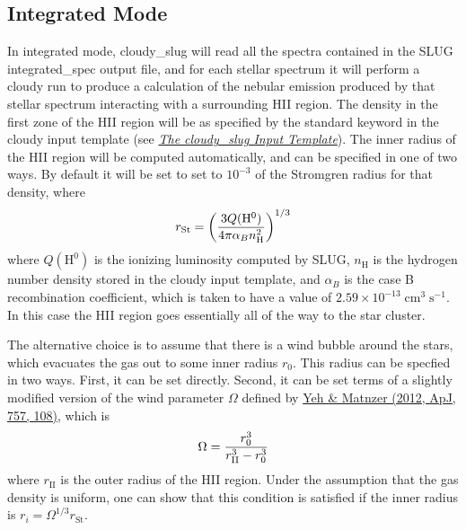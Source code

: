 \documentclass[letterpaper,10pt,english]{sphinxmanual}
\begin{document}
\subsection{Integrated Mode}
\label{cloudy:sssec-cloudy-integrated-mode}\label{cloudy:integrated-mode}
In integrated mode, cloudy\_slug will read all the spectra contained in
the SLUG integrated\_spec output file, and for each stellar spectrum it
will perform a cloudy run to produce a calculation of the nebular
emission produced by that stellar spectrum interacting with a
surrounding HII region. The density in the first zone of the HII
region will be as specified by the standard  keyword in the
cloudy input template (see {\hyperref[cloudy:ssec\string-cloudy\string-template]{\emph{The cloudy\_slug Input Template}}}). The inner
radius of the HII region will be computed automatically, and can be
specified in one of two ways. By default it will be set to
set to \(10^{-3}\) of the Stromgren radius for that density, where
\begin{gather}
\begin{split}r_{\mathrm{St}} = \left(\frac{3 Q(\mathrm{H}^0)}{4\pi
\alpha_B n_{\mathrm{H}}^2}\right)^{1/3}\end{split}\notag
\end{gather}
where \(Q(\mathrm{H}^0)\) is the ionizing luminosity computed by
SLUG, \(n_{\mathrm{H}}\) is the hydrogen number density stored in
the cloudy input template, and \(\alpha_B\) is the case B
recombination coefficient, which is taken to have a value of
\(2.59\times 10^{-13}\;\mathrm{cm}^3\;\mathrm{s}^{-1}\). In this
case the HII region goes essentially all of the way to the star
cluster.

The alternative choice is to assume that there is a wind bubble around
the stars, which evacuates the gas out to some inner radius
\(r_0\). This radius can be specfied in two ways. First, it can be set
directly. Second, it can be set terms of a slightly modified version
of the wind parameter \(\Omega\) defined by \href{http://adsabs.harvard.edu/abs/2012ApJ...757..108Y}{Yeh \& Matnzer (2012,
ApJ, 757, 108)}, which is
\begin{gather}
\begin{split}\Omega = \frac{r_0^3}{r_{\mathrm{II}}^3 - r_0^3}\end{split}\notag
\end{gather}
where \(r_{\mathrm{II}}\) is the outer radius of the HII region.
Under the assumption that the gas density is uniform, one can show
that this condition is satisfied if the inner radius is
\(r_i = \Omega^{1/3} r_{\mathrm{St}}\).
\end{document}
